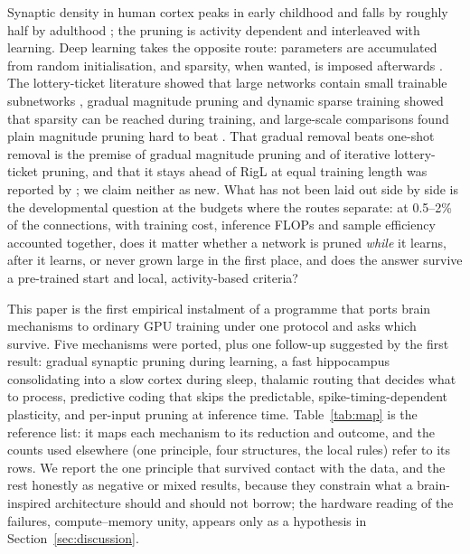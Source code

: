 \documentclass[11pt]{article}
\begin{document}
Synaptic density in human cortex peaks in early childhood and falls by roughly half by adulthood \citep{huttenlocher1979};
the pruning is activity dependent and interleaved with learning. Deep learning takes the opposite route: parameters are
accumulated from random initialisation, and sparsity, when wanted, is imposed afterwards \citep{han2015,hoefler2021}. The
lottery-ticket literature showed that large networks contain small trainable subnetworks \citep{frankle2019}, gradual
magnitude pruning \citep{zhu2017} and dynamic sparse training \citep{mocanu2018,evci2020} showed that sparsity can be
reached during training, and large-scale comparisons found plain magnitude pruning hard to beat \citep{gale2019}. That
gradual removal beats one-shot removal is the premise of gradual magnitude pruning and of iterative lottery-ticket pruning,
and that it stays ahead of RigL at equal training length was reported by \citet{evci2020}; we claim neither as new. What
has not been laid out side by side is the developmental question at the budgets where the routes separate: at 0.5--2\% of
the connections, with training cost, inference FLOPs and sample efficiency accounted together, does it matter whether a
network is pruned \emph{while} it learns, after it learns, or never grown large in the first place, and does the answer
survive a pre-trained start and local, activity-based criteria?

This paper is the first empirical instalment of a programme that ports brain mechanisms to ordinary GPU training under one
protocol and asks which survive. Five mechanisms were ported, plus one follow-up suggested by the first result: gradual
synaptic pruning during learning, a fast hippocampus consolidating into a slow cortex during sleep, thalamic routing that
decides what to process, predictive coding that skips the predictable, spike-timing-dependent plasticity, and per-input
pruning at inference time. Table~\ref{tab:map} is the reference list: it maps each mechanism to its reduction and outcome,
and the counts used elsewhere (one principle, four structures, the local rules) refer to its rows. We report the one
principle that survived contact with the data, and the rest honestly as negative or mixed results, because they constrain
what a brain-inspired architecture should and should not borrow; the hardware reading of the failures, compute--memory
unity, appears only as a hypothesis in Section~\ref{sec:discussion}.
\end{document}
